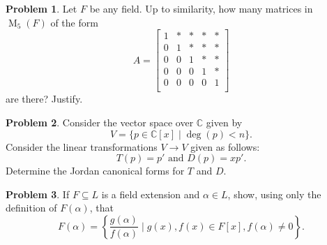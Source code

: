 \documentclass[11pt]{article}
\DeclareMathOperator{\M}{M}
\newcommand{\C}{\mathbb{C}}
\theoremstyle{definition}
\newtheorem{problem}{Problem}
\begin{document}
\begin{problem}
Let $F$ be any field. Up to similarity, how many matrices in $\M_{5}(F)$ of the  form
$$A = \begin{bmatrix}
    1 & * & * & * & * \\
    0 & 1 & * & * & * \\
    0 & 0 & 1 & * & * \\
    0 & 0 & 0 & 1 & * \\
    0 & 0 & 0 & 0 & 1 \\
\end{bmatrix}$$
are there? Justify. 
\end{problem}


\begin{problem}
	Consider the vector space over $\C$ given by
	$$V = \{ p \in \C[x] \mid \deg(p) < n \}.$$
	Consider the linear transformations $V \to V$ given as follows:
	$$T(p) = p' \textrm{ and } D(p) = xp'.$$
	Determine the Jordan canonical forms for $T$ and $D$.
\end{problem}



\begin{problem}
If $F \subseteq L$ is a field extension and $\alpha \in L$, show, using only the definition of $F(\alpha)$, that
$$F(\alpha) = \left\{ \frac{g(\alpha)}{f(\alpha)} \mid g(x), f(x) \in F[x], f(\alpha) \neq 0 \right\}.$$
\end{problem}
\end{document}
